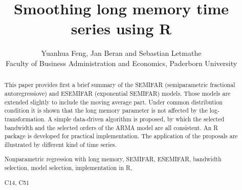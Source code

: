 \documentclass[12pt]{article}
\begin{document}
\title{Smoothing long memory time series using R}
\author{Yuanhua Feng, Jan Beran and Sebastian Letmathe\\ Faculty of Business Administration and Economics, Paderborn University}
\maketitle









\begin{abstract}
\noindent 
This paper provides first a brief summary of the SEMIFAR (semiparametric fractional autoregressiove) and ESEMIFAR (exponential SEMIFAR) models. Those models are extended slightly to include the moving average part. Under common distribution condition it is shown that the long memory parameter is not affected by the log-transformation. 
A simple data-driven algorithm is proposed, by which the selected bandwidth and the selected orders of the ARMA model are all consistent. An R package is developed for practical implementation. The application of the proposals are illustrated by different kind of time series. 

  
%

\vspace{.3cm}

 Nonparametric regression with long memory, SEMIFAR, ESEMIFAR, bandwidth selection, model selection, implementation in R, 


\vspace{.3cm}

 C14, C51
\end{abstract}

\newpage

\vspace{.5cm}

\end{document}
